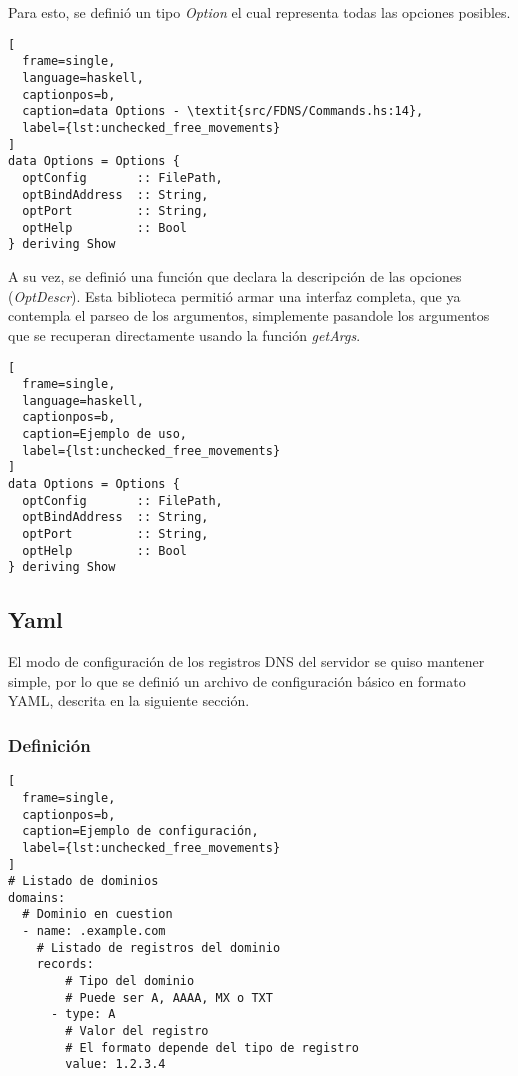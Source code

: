 \documentclass[6pt]{article}
\begin{document}
Para esto, se definió un tipo \textit{Option} el cual representa todas
las opciones posibles.

\begin{lstlisting}[
  frame=single,
  language=haskell,
  captionpos=b,
  caption=data Options - \textit{src/FDNS/Commands.hs:14},
  label={lst:unchecked_free_movements}
]
data Options = Options {
  optConfig       :: FilePath,
  optBindAddress  :: String,
  optPort         :: String,
  optHelp         :: Bool
} deriving Show
\end{lstlisting}

A su vez, se definió una función que declara la descripción de las
opciones (\textit{OptDescr}). Esta biblioteca permitió armar una interfaz
completa, que ya contempla el parseo de los argumentos, simplemente
pasandole los argumentos que se recuperan directamente usando la función
\textit{getArgs}.

\begin{lstlisting}[
  frame=single,
  language=haskell,
  captionpos=b,
  caption=Ejemplo de uso,
  label={lst:unchecked_free_movements}
]
data Options = Options {
  optConfig       :: FilePath,
  optBindAddress  :: String,
  optPort         :: String,
  optHelp         :: Bool
} deriving Show
\end{lstlisting}

\subsection{Yaml \cite{package-yaml}}

El modo de configuración de los registros DNS del servidor se quiso
mantener simple, por lo que se definió un archivo de configuración
básico en formato YAML, descrita en la siguiente sección.

\subsubsection{Definición}

\begin{lstlisting}[
  frame=single,
  captionpos=b,
  caption=Ejemplo de configuración,
  label={lst:unchecked_free_movements}
]
# Listado de dominios
domains:
  # Dominio en cuestion
  - name: .example.com
    # Listado de registros del dominio
    records:
        # Tipo del dominio
        # Puede ser A, AAAA, MX o TXT
      - type: A
        # Valor del registro
        # El formato depende del tipo de registro
        value: 1.2.3.4
\end{lstlisting}
\end{document}
